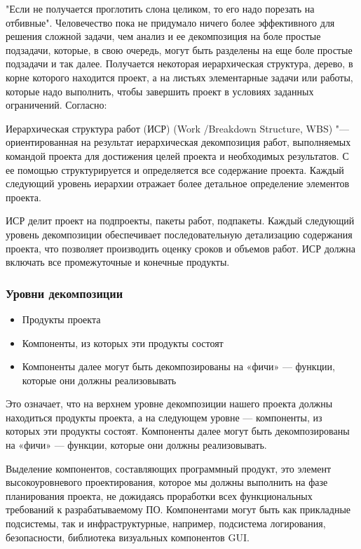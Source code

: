 \documentclass{../industrial-development}
\begin{document}
"Если не получается проглотить слона целиком, то его надо порезать на отбивные". Человечество пока не придумало ничего более эффективного для решения сложной задачи, чем анализ и ее декомпозиция на боле простые подзадачи, которые, в свою очередь, могут быть разделены на еще боле простые подзадачи и так далее. Получается некоторая иерархическая структура, дерево, в корне которого находится проект, а на листьях элементарные задачи или работы, которые надо выполнить, чтобы завершить проект в условиях заданных ограничений. Согласно:

Иерархическая структура работ (ИСР) (Work /Breakdown Structure, WBS) "--- ориентированная на результат иерархическая декомпозиция работ, выполняемых командой проекта для достижения целей проекта и необходимых результатов. С ее помощью структурируется и определяется все содержание проекта. Каждый следующий уровень иерархии отражает более детальное определение элементов проекта.

ИСР делит проект на подпроекты, пакеты работ, подпакеты. Каждый следующий уровень декомпозиции обеспечивает последовательную детализацию содержания проекта, что позволяет производить оценку сроков и объемов работ. ИСР должна включать все промежуточные и конечные продукты. 

    \begin{frame} \frametitle{Уровни декомпозиции}
	\begin{itemize}
		\item Продукты проекта
		\item Компоненты, из которых эти продукты состоят
		\item Компоненты далее могут быть декомпозированы на «фичи» — функции, которые они должны реализовывать
	\end{itemize}
    \end{frame}
    \lecturenotes

Это означает, что на верхнем уровне декомпозиции нашего проекта должны находиться продукты проекта, а на следующем уровне — компоненты, из которых эти продукты состоят. Компоненты далее могут быть декомпозированы на «фичи» — функции, которые они должны реализовывать.

Выделение компонентов, составляющих программный продукт, это элемент высокоуровневого проектирования, которое мы должны выполнить на фазе планирования проекта, не дожидаясь проработки всех функциональных требований к разрабатываемому ПО. Компонентами могут быть как прикладные подсистемы, так и инфраструктурные, например, подсистема логирования, безопасности, библиотека визуальных компонентов GUI.
\end{document}
